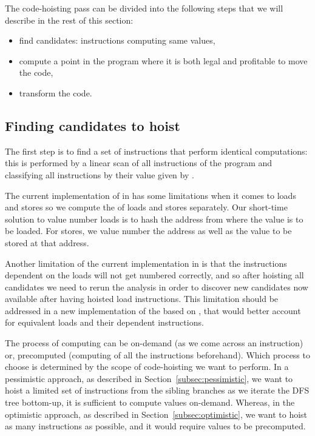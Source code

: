 \documentclass{sig-alternate}
\begin{document}
The code-hoisting pass can be divided into the following steps that we will
describe in the rest of this section:
\begin{itemize}
\item find candidates: instructions computing same values,
\item compute a point in the program where it is both legal and profitable to
  move the code,
\item transform the code.
\end{itemize}

\subsection{Finding candidates to hoist}
The first step is to find a set of instructions that perform identical
computations: this is performed by a linear scan of all instructions of the
program and classifying all instructions by their value given by \GVN{}.

The current implementation of \GVN{} in \LLVM{} has some limitations when it comes to
loads and stores so we compute the \GVN{} of loads and stores separately.  Our
short-time solution to value number loads is to hash the address from where the
value is to be loaded. For stores, we value number the address as well as the
value to be stored at that address.

Another limitation of the current \GVN{} implementation in \LLVM{} is that the
instructions dependent on the loads will not get numbered correctly, and so
after hoisting all candidates we need to rerun the \GVN{} analysis in order to
discover new candidates now available after having hoisted load instructions.
This limitation should be addressed in a new implementation of the \GVN{} based on
\MemorySSA{}, that would better account for equivalent loads and their dependent
instructions.

The process of computing \GVN{} can be on-demand (as we come across an instruction)
or, precomputed (computing \GVN{} of all the instructions beforehand). Which
process to choose is determined by the scope of code-hoisting we want to
perform. In a pessimistic approach, as described in
Section~\ref{subsec:pessimistic}, we want to hoist a limited set of instructions
from the sibling branches as we iterate the DFS tree bottom-up, it is sufficient
to compute \GVN{} values on-demand. Whereas, in the optimistic approach, as
described in Section~\ref{subsec:optimistic}, we want to hoist as many
instructions as possible, and it would require \GVN{} values to be precomputed.
\end{document}
